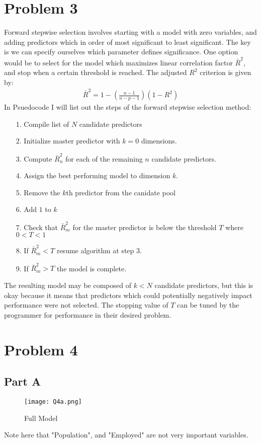 \documentclass{article}
\begin{document}
\section*{Problem 3}
Forward stepwise selection involves starting with a model with zero variables, and adding predictors which in order of most significant to least significant. The key is we can specify ourselves which parameter defines significance. One option would be to select for the model which maximizes linear correlation factor $\bar{R}^2$, and stop when a certain threshold is reached.
The adjusted $R^2$ criterion is given by:
\begin{align*}
\bar{R}^2 = 1- (\frac{n-1}{n-p-1}) (1-R^2)
\end{align*}
In Psuedocode I will list out the steps of the forward stepwise selection method:
\begin{enumerate}
\item[1.] Compile list of $N$ candidate predictors
\item[2.] Initialize master predictor with $k=0$ dimensions.
\item[3.] Compute $\bar{R}^2_n$ for each of the remaining $n$ candidate predictors.
\item[4.] Assign the best performing model to dimension $k$.
\item[5.] Remove the $k$th predictor from the canidate pool
\item[6.] Add $1$ to $k$
\item[7.] Check that $\bar{R}^2_m$ for the master predictor is below the threshold $T$ where $0<T<1$
\item[8.] If $\bar{R}^2_m<T$ resume algorithm at step 3.
\item[9.] If $\bar{R}^2_m>T$ the model is complete.
\end{enumerate}

The resulting model may be composed of $k<N$ candidate predictors, but this is okay because it means that predictors which could potentially negatively impact performance were not selected. The stopping value of $T$ can be tuned by the programmer for performance in their desired problem.
\clearpage
\section*{Problem 4}
\subsection*{Part A}
\begin{figure}[hbt!]
\centering
\texttt{[image: Q4a.png]}
\caption{Full Model}
\end{figure}
Note here that "Population", and "Employed" are not very important variables.
\end{document}

